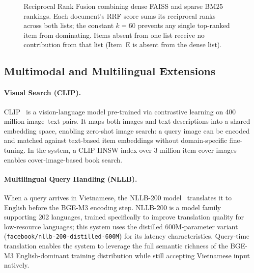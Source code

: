 \begin{figure}[H]
\begin{tikzpicture}
\end{tikzpicture}
\caption{Reciprocal Rank Fusion combining dense FAISS and sparse BM25 rankings. Each document's RRF score sums its reciprocal ranks across both lists; the constant $k=60$ prevents any single top-ranked item from dominating. Items absent from one list receive no contribution from that list (Item~E is absent from the dense list).}
\label{fig:rrf_fusion}
\end{figure}

\subsection{Multimodal and Multilingual Extensions}
\label{sec:multimodal}

\paragraph{Visual Search (CLIP).}
CLIP~\cite{radford2021clip} is a vision-language model pre-trained via contrastive learning on 400 million image–text pairs.
It maps both images and text descriptions into a shared embedding space, enabling zero-shot image search: a query image can be encoded and matched against text-based item embeddings without domain-specific fine-tuning.
In the system, a CLIP HNSW index over 3 million item cover images enables cover-image-based book search.

\paragraph{Multilingual Query Handling (NLLB).}
When a query arrives in Vietnamese, the NLLB-200 model~\cite{nllb2022} translates it to English before the BGE-M3 encoding step.
NLLB-200 is a model family supporting 202 languages, trained specifically to improve translation quality for low-resource languages; this system uses the distilled 600M-parameter variant (\texttt{facebook/nllb-200-distilled-600M}) for its latency characteristics.
Query-time translation enables the system to leverage the full semantic richness of the BGE-M3 English-dominant training distribution while still accepting Vietnamese input natively.

